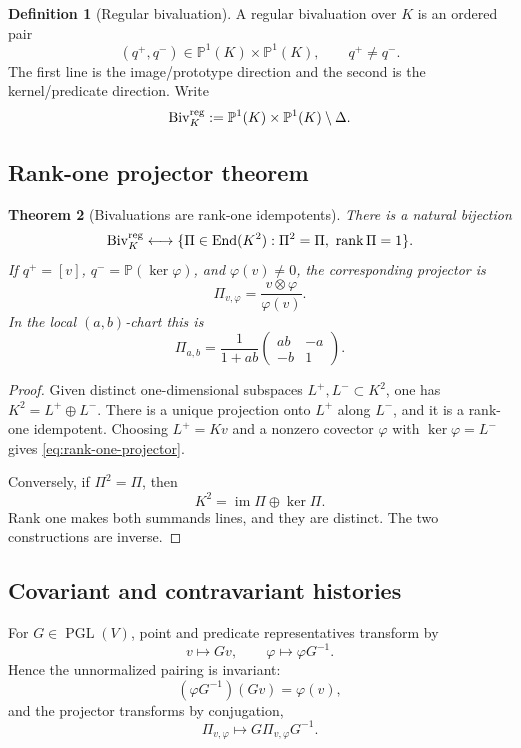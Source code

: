 \documentclass[11pt]{article}
\newtheorem{theorem}{Theorem}[section]
\theoremstyle{definition}
\newtheorem{definition}[theorem]{Definition}
\theoremstyle{remark}
\newcommand{\PGL}{\operatorname{PGL}}
\newcommand{\Biv}{\operatorname{Biv}}
\newcommand{\im}{\operatorname{im}}
\newcommand{\PP}{\mathbb P}
\begin{document}
\begin{definition}[Regular bivaluation]
A regular bivaluation over \(K\) is an ordered pair
\[
(q^+,q^-)\in\PP^1(K)\times\PP^1(K),
\qquad q^+\neq q^-.
\]
The first line is the image/prototype direction and the second is the
kernel/predicate direction.  Write
\[
\Biv_K^{\rm reg}
:=
\PP^1(K)\times\PP^1(K)\setminus\Delta.
\]
\end{definition}

\subsection{Rank-one projector theorem}

\begin{theorem}[Bivaluations are rank-one idempotents]
\label{thm:biv-idempotent}
There is a natural bijection
\[
\Biv_K^{\rm reg}
\longleftrightarrow
\{\Pi\in\operatorname{End}(K^2):
\Pi^2=\Pi,\ \operatorname{rank}\Pi=1\}.
\]
If \(q^+=[v]\), \(q^-=\PP(\ker\varphi)\), and
\(\varphi(v)\neq0\), the corresponding projector is
\begin{equation}
\Pi_{v,\varphi}
=\frac{v\otimes\varphi}{\varphi(v)}.
\label{eq:rank-one-projector}
\end{equation}
In the local \((a,b)\)-chart this is
\[
\Pi_{a,b}
=
\frac{1}{1+ab}
\begin{pmatrix}
ab&-a\\
-b&1
\end{pmatrix}.
\]
\end{theorem}

\begin{proof}
Given distinct one-dimensional subspaces \(L^+,L^-\subset K^2\), one has
\(K^2=L^+\oplus L^-\).  There is a unique projection onto \(L^+\) along
\(L^-\), and it is a rank-one idempotent.  Choosing
\(L^+=Kv\) and a nonzero covector \(\varphi\) with
\(\ker\varphi=L^-\) gives \eqref{eq:rank-one-projector}.

Conversely, if \(\Pi^2=\Pi\), then
\[
K^2=\im\Pi\oplus\ker\Pi.
\]
Rank one makes both summands lines, and they are distinct.  The two
constructions are inverse.
\end{proof}

\subsection{Covariant and contravariant histories}

For \(G\in\PGL(V)\), point and predicate representatives transform by
\[
v\longmapsto Gv,
\qquad
\varphi\longmapsto\varphi G^{-1}.
\]
Hence the unnormalized pairing is invariant:
\[
(\varphi G^{-1})(Gv)=\varphi(v),
\]
and the projector transforms by conjugation,
\[
\Pi_{v,\varphi}\longmapsto G\Pi_{v,\varphi}G^{-1}.
\]
\end{document}
